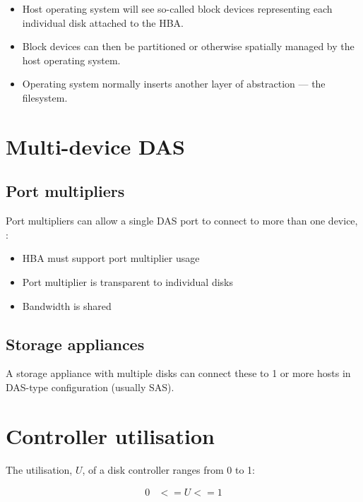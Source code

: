 \begin{itemize}
\item
  Host operating system will see so-called block devices representing
  each individual disk attached to the HBA.
\item
  Block devices can then be partitioned or otherwise spatially managed
  by the host operating system.
\item
  Operating system normally inserts another layer of abstraction --- the
  filesystem.
\end{itemize}

\section{Multi-device DAS}\label{multi-device-das}

\subsection{Port multipliers}\label{port-multipliers}

Port multipliers can allow a single DAS port to connect to more than one
device, :

\begin{itemize}
\item
  HBA must support port multiplier usage
\item
  Port multiplier is transparent to individual disks
\item
  Bandwidth is shared
\end{itemize}

\subsection{Storage appliances}
\label{sec:storage-appliances}

A storage appliance with multiple disks can connect these to 1 or more
hosts in DAS-type configuration (usually SAS).

\section{Controller utilisation}
\label{sec:controller-utilisation}

The utilisation, $U$, of a disk controller ranges from 0 to 1:

\begin{align}
  0 & <= U <= 1 \label{eq:utilisation-range}
\end{align}

